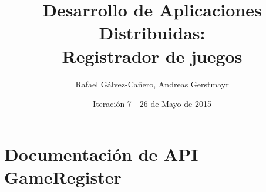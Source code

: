 \documentclass[12pt,a4paper]{report}
\title{Desarrollo de Aplicaciones Distribuidas: \\ Registrador de juegos}
\author{Rafael Gálvez-Cañero, Andreas Gerstmayr}
\date{Iteración 7 - 26 de Mayo de 2015} %
\begin{document}
\maketitle
\tableofcontents
\listoffigures
\listoftables











 





\chapter{Documentación de API GameRegister}

\end{document}
